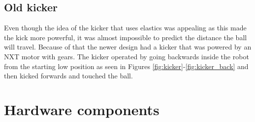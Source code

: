 \documentclass[a4paper,12pt]{article}
\begin{document}
%	

\subsection{Old kicker}
Even though the idea of the kicker that uses elastics was appealing as this made
the kick more powerful, it was almost impossible to predict the distance the
ball will travel. Because of that the newer design had a
kicker that was powered by an NXT motor with gears. The kicker operated by going backwards inside the robot from the starting low position as seen in Figures \ref{fig:kicker}-\ref{fig:kicker_back} and then kicked
forwards and touched the ball.
%		

\section{Hardware components}
\end{document}
